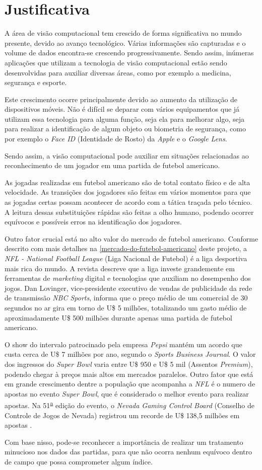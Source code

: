 \section{\textbf{Justificativa}}

A área de visão computacional tem crescido de forma significativa no mundo presente, devido ao avanço tecnológico. Várias informações são capturadas e o volume de dados encontra-se crescendo progressivamente. Sendo assim, inúmeras aplicações que utilizam a tecnologia de visão computacional estão sendo desenvolvidas para auxiliar diversas áreas, como por exemplo a medicina, segurança e esporte.

Este crescimento ocorre principalmente devido ao aumento da utilização de dispositivos móveis. Não é difícil se deparar com vários equipamentos que já utilizam essa tecnologia para alguma função, seja ela para melhorar algo, seja para realizar a identificação de algum objeto ou biometria de segurança, como por exemplo o \textit{Face ID} (Identidade de Rosto) da \textit{Apple} e o \textit{Google Lens}.

Sendo assim, a visão computacional pode auxiliar em situações relacionadas ao reconhecimento de um jogador em uma partida de futebol americano.

As jogadas realizadas em futebol americano são de total contato físico e de alta velocidade. As transições dos jogadores são feitas em vários momentos para que as jogadas certas possam acontecer de acordo com a tática traçada pelo técnico. A leitura dessas substituições rápidas são feitas a olho humano, podendo ocorrer equívocos e possíveis erros na identificação dos jogadores.

Outro fator crucial está no alto valor do mercado de futebol americano. Conforme descrito com mais detalhes na \autoref{mercado-do-futebol-americano} deste projeto, a \textit{NFL - National Football League} (Liga Nacional de Futebol) é a liga desportiva mais rica do mundo. A revista  descreve que a liga investe grandemente em ferramentas de \textit{marketing} digital e tecnologias que auxiliam no desempenho dos jogos. Dan Lovinger, vice-presidente executivo de vendas de publicidade da rede de transmissão \textit{NBC Sports}, informa que o preço médio de um comercial de 30 segundos no ar gira em torno de U\$ 5 milhões, totalizando um gasto médio de aproximadamente U\$ 500 milhões durante apenas uma partida de futebol americano.

O show do intervalo patrocinado pela empresa \textit{Pepsi} mantém um acordo que custa cerca de U\$ 7 milhões por ano, segundo o \textit{Sports Business Journal}. O valor dos ingressos do \textit{Super Bowl} varia entre U\$ 950 e U\$ 5 mil (Assentos \textit{Premium}), podendo chegar à preços mais altos em mercados paralelos. Outro fator que está em grande crescimento dentre a população que acompanha a \textit{NFL} é o numero de apostas no evento \textit{Super Bowl}, que é considerado o melhor evento para realizar apostas. Na 51\textsuperscript{\underline{a}} edição do evento, o \textit{Nevada Gaming Control Board} (Conselho de Controle de Jogos de Nevada) registrou um recorde de U\$ 138,5 milhões em apostas \cite{FORBES2018}.

Com base nisso, pode-se reconhecer a importância de realizar um tratamento minucioso nos dados das partidas, para que não ocorra nenhum equívoco dentro de campo que possa comprometer algum índice.